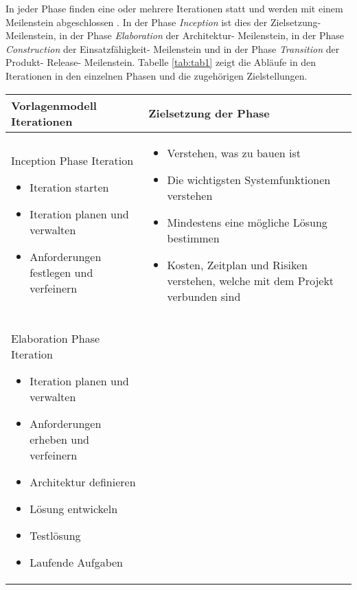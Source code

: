 In jeder Phase finden eine oder mehrere Iterationen statt und werden mit einem Meilenstein abgeschlossen \cite{Basem2010}. In der Phase \textit{Inception} ist dies der Zielsetzung- Meilenstein, in der Phase \textit{Elaboration} der Architektur- Meilenstein, in der Phase \textit{Construction} der Einsatzfähigkeit- Meilenstein und in der Phase \textit{Transition} der Produkt- Release- Meilenstein. Tabelle \ref{tab:tab1} zeigt die Abläufe in den Iterationen in den einzelnen Phasen und die zugehörigen Zielstellungen.
\begin{longtable}{|p{7cm}|p{8cm}|}
\hline
Vorlagenmodell Iterationen & Zielsetzung der Phase \\
\hline
Inception Phase Iteration 
\begin {itemize}
\item Iteration starten 
 \item  Iteration planen und verwalten
 \item  Anforderungen festlegen und verfeinern 
  \end{itemize}
   &
  
  \begin {itemize}
\item Verstehen, was zu bauen ist
 \item Die wichtigsten Systemfunktionen verstehen 
\item Mindestens eine mögliche Lösung bestimmen
\item Kosten, Zeitplan und Risiken verstehen, welche mit dem Projekt verbunden sind
  \end{itemize}

 \\
\hline
 Elaboration Phase Iteration 
   \begin {itemize}
   \item Iteration planen und verwalten
   \item Anforderungen erheben und verfeinern
   \item Architektur definieren
   \item Lösung entwickeln
   \item Testlösung
   \item Laufende Aufgaben
   
  \end{itemize}


\end{longtable}
